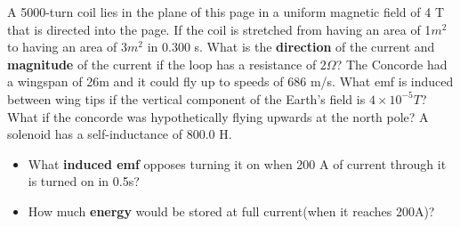 \documentclass[12pt,addpoints]{exam}
\begin{document}
\begin{questions}
					\question A 5000-turn coil lies in the plane of this page in a uniform magnetic field of 4 T that is directed into the page. If the coil is stretched from having an area of 1$m^2$ to having an area of 3$m^2$ in 0.300 s. What is the \textbf{direction} of the current and \textbf{magnitude} of the current if the loop has a resistance of 2$\Omega$?
					\question The Concorde had a wingspan of 26m and it could fly up to speeds of 686 m/s. What emf is induced between wing tips if the vertical component of the Earth’s field is $4\times10^{-5}T$? What if the concorde was hypothetically flying upwards at the north pole?
					\question A solenoid has a self-inductance of 800.0 H. 
					\begin{itemize}
						\item What \textbf{induced emf} opposes turning it on when 200 A of current through it is turned on in 0.5s?
						\item How much \textbf{energy} would be stored at full current(when it reaches 200A)?
					\end{itemize}
				\end{questions}
				
			
\end{document}
